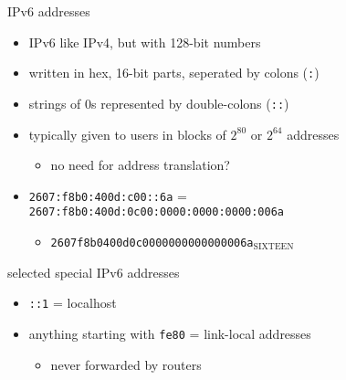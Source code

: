 \begin{frame}{IPv6 addresses}
    \begin{itemize}
    \item IPv6 like IPv4, but with 128-bit numbers
    \item written in hex, 16-bit parts, seperated by colons (\texttt{:})
    \item strings of 0s represented by double-colons (\texttt{::})
    \item typically given to users in blocks of $2^{80}$ or $2^{64}$ addresses
        \begin{itemize}
        \item no need for address translation?
        \end{itemize}
    \vspace{.5cm}
    \item \fontsize{10}{11}\selectfont\texttt{2607:f8b0:400d:c00::6a} = \\
          \texttt{2607:f8b0:400d:0c00:0000:0000:0000:006a}
          \begin{itemize}
          \item \texttt{2607f8b0400d0c0000000000000006a}$_\text{SIXTEEN}$
          \end{itemize}
    \end{itemize}
\end{frame}

\begin{frame}{selected special IPv6 addresses}
    \begin{itemize}
    \item \texttt{::1} = localhost
    \item anything starting with \texttt{fe80} = link-local addresses
        \begin{itemize}
        \item never forwarded by routers
        \end{itemize}
    \end{itemize}
\end{frame}

